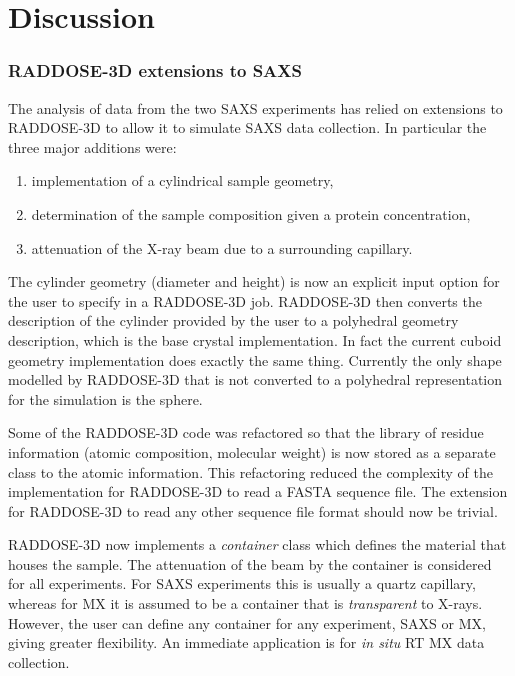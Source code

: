 \section{Discussion}
\label{sec:Discussion - SAXS}

\subsubsection{RADDOSE-3D extensions to SAXS}
\label{subs:RADDOSE-3D extensions to SAXS}

The analysis of data from the two SAXS experiments has relied on extensions to RADDOSE-3D to allow it to simulate SAXS data collection.
In particular the three major additions were:
\begin{enumerate}
    \item implementation of a cylindrical sample geometry,
    \item determination of the sample composition given a protein concentration,
    \item attenuation of the X-ray beam due to a surrounding capillary.
\end{enumerate}
The cylinder geometry (diameter and height) is now an explicit input option for the user to specify in a RADDOSE-3D job.
RADDOSE-3D then converts the description of the cylinder provided by the user to a polyhedral geometry description, which is the base crystal implementation.
In fact the current cuboid geometry implementation does exactly the same thing.
Currently the only shape modelled by RADDOSE-3D that is not converted to a polyhedral representation for the simulation is the sphere.

Some of the RADDOSE-3D code was refactored so that the library of residue information (atomic composition, molecular weight) is now stored as a separate class to the atomic information. This refactoring reduced the complexity of the implementation for RADDOSE-3D to read a FASTA sequence file. The extension for RADDOSE-3D to read any other sequence file format should now be trivial.

RADDOSE-3D now implements a \textit{container} class which defines the material that houses the sample.
The attenuation of the beam by the container is considered for all experiments.
For SAXS experiments this is usually a quartz capillary, whereas for MX it is assumed to be a container that is \textit{transparent} to X-rays.
However, the user can define any container for any experiment, SAXS or MX, giving greater flexibility.
An immediate application is for \textit{in situ} RT MX data collection.

